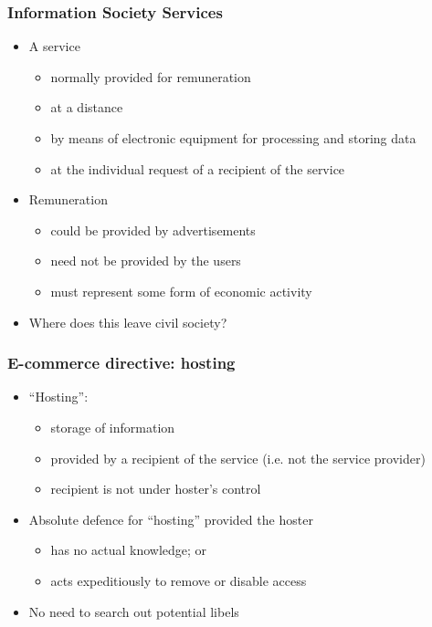 \documentclass[ignorenonframetext,]{beamer}
\begin{document}
\begin{frame}
  \frametitle{Information Society Services}
  \begin{itemize}
  \item A service
    \begin{itemize}
    \item normally provided for remuneration
    \item at a distance
    \item by means of electronic equipment for processing and storing data
    \item at the individual request of a recipient of the service
    \end{itemize}
  \item Remuneration
    \begin{itemize}
    \item could be provided by advertisements
    \item need not be provided by the users
    \item must represent some form of economic activity
    \end{itemize}
  \item Where does this leave civil society?
  \end{itemize}
\end{frame}

\begin{frame}
  \frametitle{E-commerce directive: hosting}
  \begin{itemize}
  \item ``Hosting'':
    \begin{itemize}
    \item storage of information
    \item provided by a recipient of the service (i.e. not the service provider)
    \item recipient is not under hoster's control
   \end{itemize}
  \item Absolute defence for ``hosting'' provided the hoster
    \begin{itemize}
    \item has no actual knowledge; or
    \item acts expeditiously to remove or disable access
    \end{itemize}
  \item  {No need to search out potential libels}
  \end{itemize}
  
\end{frame}
\end{document}
